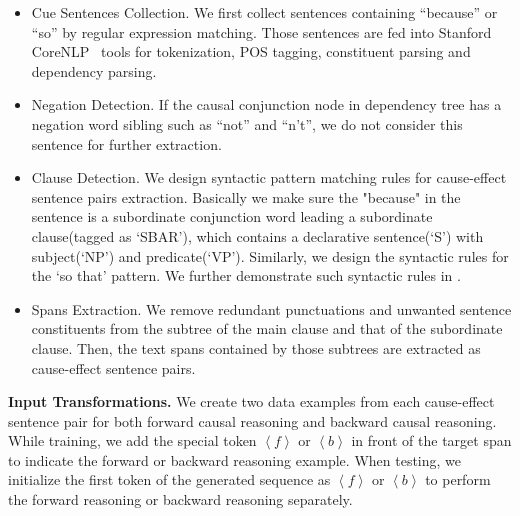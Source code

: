 \begin{itemize}
	\item Cue Sentences Collection. 
	We first collect sentences containing ``because'' or ``so'' by regular expression matching. Those sentences are fed into Stanford CoreNLP~\cite{stanfordcorenlp} tools for tokenization, POS tagging, constituent parsing and dependency parsing.
	\item Negation Detection. 
	If the causal conjunction node in dependency tree
	has a negation word sibling such as ``not'' and ``n't'', 
	we do not consider this sentence for further extraction.
	\item Clause Detection. 
	We design syntactic pattern matching rules for 
	cause-effect sentence pairs extraction.
	 Basically we make sure the "because" in the sentence is a subordinate conjunction word leading a subordinate clause(tagged as `SBAR'), which contains a declarative 
	sentence(`S') with subject(`NP') and predicate(`VP').
	Similarly, we design the syntactic rules for the `so that' pattern.
	We further demonstrate such syntactic rules in .
	
	\item Spans Extraction. 
	We remove redundant punctuations and unwanted sentence
	constituents from the subtree of the main clause and that of the subordinate clause. Then, the text spans contained by those subtrees are extracted as cause-effect sentence pairs.

\end{itemize}

\textbf{Input Transformations.} 
We create two data examples from each cause-effect sentence pair for both forward causal reasoning and backward causal reasoning.
While training, we add the special token $\left< f\right>$ or $\left< b \right>$ in front of the target span to indicate the forward or backward reasoning example.
When testing, we initialize the first token of the generated sequence as $\left< f\right>$ or $\left< b \right>$  to perform the forward reasoning or backward reasoning separately.

